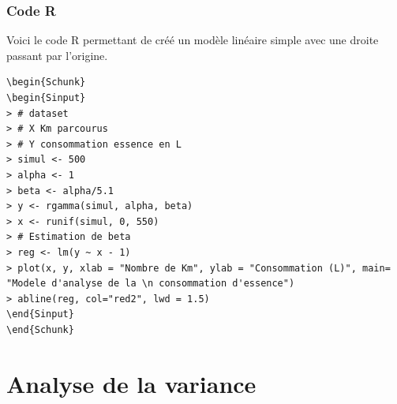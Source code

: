 \documentclass[11pt,french]{report}
\begin{document}
\subsubsection*{Code R}
Voici le code R permettant de créé un modèle linéaire simple avec une droite passant par l'origine.

\begin{lstlisting}[linerange=\\begin\{Sinput\}-\\end\{Sinput\},includerangemarker=false, caption = Code source en R pour l'exemple]
\begin{Schunk}
\begin{Sinput}
> # dataset
> # X Km parcourus
> # Y consommation essence en L
> simul <- 500
> alpha <- 1
> beta <- alpha/5.1
> y <- rgamma(simul, alpha, beta)
> x <- runif(simul, 0, 550)
> # Estimation de beta
> reg <- lm(y ~ x - 1)
> plot(x, y, xlab = "Nombre de Km", ylab = "Consommation (L)", main= "Modele d'analyse de la \n consommation d'essence")
> abline(reg, col="red2", lwd = 1.5)
\end{Sinput}
\end{Schunk}
\end{lstlisting}

\bigskip


\section{Analyse de la variance}

\newpage
\appendix
\end{document}
